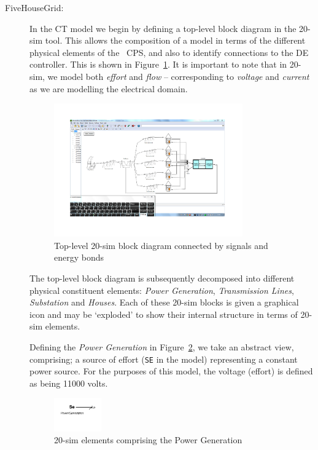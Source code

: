 \begin{description}

\item[FiveHouseGrid:]

In the CT model we begin by defining a top-level block diagram in the 20-sim tool. This allows the composition of a model in terms of the different physical elements of the \SG\ CPS, and also to identify connections to the DE controller. This is shown in Figure~\ref{fig:20sim-sos}. It is important to note that in 20-sim, we model both \emph{effort} and \emph{flow} -- corresponding to \emph{voltage} and \emph{current} as we are modelling the electrical domain.


\begin{figure}[htb]
\begin{center}
\includegraphics[width=0.8\textwidth]{smartgrid/20-sim-sos.pdf}
\caption{Top-level 20-sim block diagram connected by signals and energy bonds}
\label{fig:20sim-sos}
\end{center}
\end{figure}


The top-level block diagram is subsequently decomposed into different physical constituent elements: \textit{Power Generation}, \textit{Transmission Lines}, \textit{Substation} and \textit{Houses}. Each of these 20-sim blocks is given a graphical icon and may be `exploded' to show their internal structure in terms of 20-sim elements.

Defining the \textit{Power Generation} in Figure~\ref{fig:20sim-powergen}, we take an abstract view, comprising; a source of effort (\texttt{SE} in the model) representing a constant power source. For the purposes of this model, the voltage (effort) is defined as being 11000 volts.


\begin{figure}[htb]
\begin{center}
\includegraphics[width=0.2\textwidth]{smartgrid/20-sim-powergen.pdf}
\caption{20-sim elements comprising the Power Generation}
\label{fig:20sim-powergen}
\end{center}
\end{figure}


\end{description}
